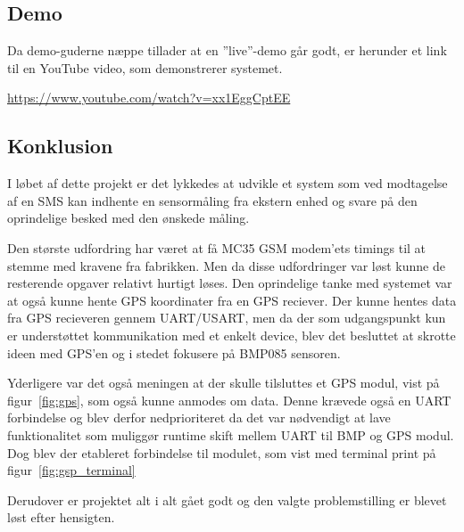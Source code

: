\subsection{Demo}
Da demo-guderne næppe tillader at en ''live''-demo går godt, er herunder et link til en YouTube video, som demonstrerer systemet.

\vskip 0.5cm
	\begin{center}
		\url{https://www.youtube.com/watch?v=xx1EggCptEE}
	\end{center}
\vskip 0.5cm

\subsection{Konklusion}

I løbet af dette projekt er det lykkedes at udvikle et system som ved modtagelse af en SMS kan indhente en sensormåling fra ekstern enhed og svare på den oprindelige besked med den ønskede måling. 

Den største udfordring har været at få MC35 GSM modem'ets timings til at stemme med kravene fra fabrikken. Men da disse udfordringer var løst kunne de resterende opgaver relativt hurtigt løses.
Den oprindelige tanke med systemet var at også kunne hente GPS koordinater fra en GPS reciever. Der kunne hentes data fra GPS recieveren gennem UART/USART, men da der som udgangspunkt kun 
er understøttet kommunikation med et enkelt device, blev det besluttet at skrotte ideen med GPS'en og i stedet fokusere på BMP085 sensoren.

Yderligere var det også meningen at der skulle tilsluttes et GPS modul, vist på figur~\ref{fig:gps}, som også kunne anmodes om data. Denne krævede også en UART forbindelse og blev derfor nedprioriteret da det var nødvendigt at lave funktionalitet som muliggør runtime skift mellem UART til BMP og GPS modul. Dog blev der etableret forbindelse til modulet, som vist med terminal print på figur~\ref{fig:gsp_terminal}

Derudover er projektet alt i alt gået godt og den valgte problemstilling er blevet løst efter hensigten. 
